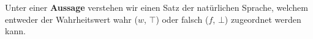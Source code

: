 \documentclass[../../main.tex]{subfiles}
\begin{document}

	
	\begin{definition}[Aussage]
		\label{def:Aussage}
		Unter einer \textbf{Aussage} verstehen wir einen Satz der natürlichen Sprache, welchem entweder der Wahrheitswert wahr ($w$, $\top$) oder falsch ($f$, $\bot$) zugeordnet werden kann.
	\end{definition}
	
\end{document}
